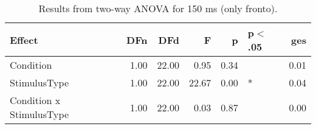 \begin{table}[ht]
\centering
\begin{tabulary}{\textwidth}{lrrrrlr}
  \toprule
Effect & DFn & DFd & F & p & p$<$.05 & ges \\ 
  \midrule
Condition & 1.00 & 22.00 & 0.95 & 0.34 &  & 0.01 \\ 
  StimulusType & 1.00 & 22.00 & 22.67 & 0.00 & * & 0.04 \\ 
  Condition x StimulusType & 1.00 & 22.00 & 0.03 & 0.87 &  & 0.00 \\ 
   \bottomrule
\end{tabulary}
\caption{Results from two-way ANOVA for 150 ms (only fronto).} 
\end{table}
